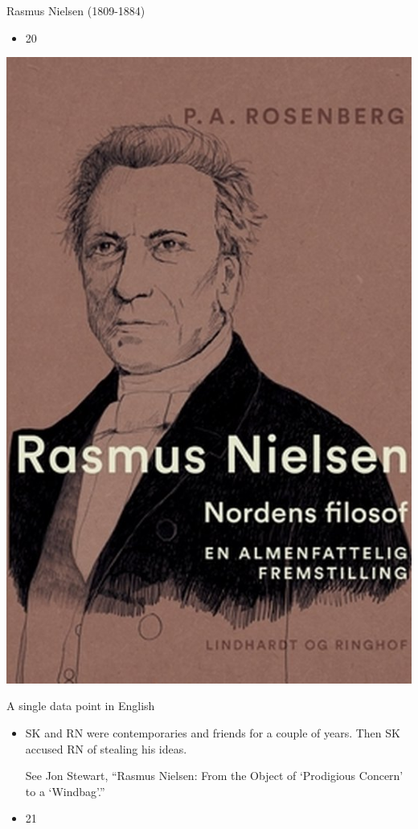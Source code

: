 \documentclass{beamer}
\begin{document}
\begin{frame}{Rasmus Nielsen (1809-1884)}
\begin{itemize}
  \item 20
\end{itemize}
\includegraphics[width=0.9\linewidth]{slide20_img7.jpg}
\end{frame}
\begin{frame}{A single data point in English}
\begin{itemize}
  \item SK and RN were contemporaries and friends for a couple of years. Then SK accused RN of stealing his ideas.


			See Jon Stewart, “Rasmus Nielsen: From the Object of ‘Prodigious Concern’ to a ‘Windbag’.”
  \item 21
\end{itemize}
\end{frame}
\end{document}

